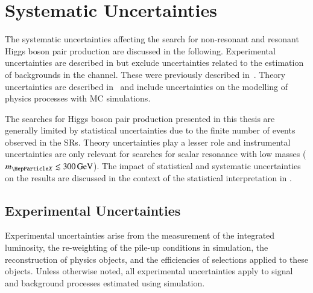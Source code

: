 \section{Systematic Uncertainties}%
\label{sec:uncertainties}

The systematic uncertainties affecting the search for non-resonant and resonant
Higgs boson pair production are discussed in the following. Experimental
uncertainties are described in  but exclude
uncertainties related to the estimation of \faketauhadvis backgrounds in the
\hadhad channel. These were previously described
in~. Theory uncertainties are
described in~ and include uncertainties on the
modelling of physics processes with MC simulations.

The searches for Higgs boson pair production presented in this thesis are
generally limited by statistical uncertainties due to the finite number of
events observed in the SRs. Theory uncertainties play a lesser role and
instrumental uncertainties are only relevant for searches for scalar resonance
with low masses ($\mX \lesssim \SI{300}{\GeV}$). The impact of statistical and
systematic uncertainties on the results are discussed in the context of the
statistical interpretation in .


\subsection{Experimental Uncertainties}%
\label{sec:experimental_uncertainties}

Experimental uncertainties arise from the measurement of the integrated
luminosity, the re-weighting of the pile-up conditions in simulation, the
reconstruction of physics objects, and the efficiencies of selections applied to
these objects. Unless otherwise noted, all experimental uncertainties apply to
signal and background processes estimated using simulation.

